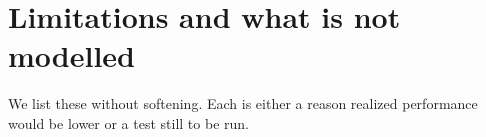 \documentclass[11pt]{article}
\theoremstyle{definition}
\newcommand{\1}{\mathbf{1}}
\begin{document}
\begin{table}[t]\centering
\caption{Attribution ladder, all equity books (return as each fix is applied; Sharpe and drawdown before and after).}\label{tab:ladderall}

\end{table}




\section{Limitations and what is not modelled}\label{sec:limits}

We list these without softening. Each is either a reason realized performance would be lower or a test still to be run.
\end{document}
